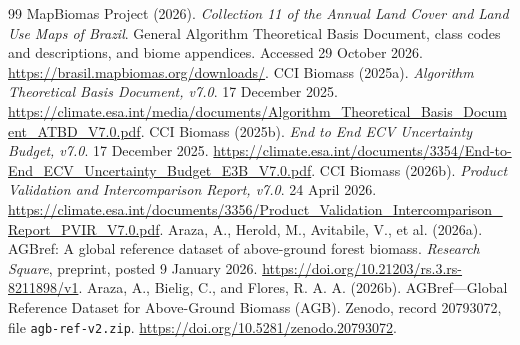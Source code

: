 \documentclass[11pt,a4paper]{article}
\begin{document}
\begin{thebibliography}{99}
 MapBiomas Project (2026). \emph{Collection 11 of the Annual Land Cover and Land Use Maps of Brazil}. General Algorithm Theoretical Basis Document, class codes and descriptions, and biome appendices. Accessed 29 October 2026. \url{https://brasil.mapbiomas.org/downloads/}.
 CCI Biomass (2025a). \emph{Algorithm Theoretical Basis Document, v7.0}. 17 December 2025. \url{https://climate.esa.int/media/documents/Algorithm_Theoretical_Basis_Document_ATBD_V7.0.pdf}.
 CCI Biomass (2025b). \emph{End to End ECV Uncertainty Budget, v7.0}. 17 December 2025. \url{https://climate.esa.int/documents/3354/End-to-End_ECV_Uncertainty_Budget_E3B_V7.0.pdf}.
 CCI Biomass (2026b). \emph{Product Validation and Intercomparison Report, v7.0}. 24 April 2026. \url{https://climate.esa.int/documents/3356/Product_Validation_Intercomparison_Report_PVIR_V7.0.pdf}.
 Araza, A., Herold, M., Avitabile, V., et al. (2026a). AGBref: A global reference dataset of above-ground forest biomass. \emph{Research Square}, preprint, posted 9 January 2026. \url{https://doi.org/10.21203/rs.3.rs-8211898/v1}.
 Araza, A., Bielig, C., and Flores, R. A. A. (2026b). AGBref---Global Reference Dataset for Above-Ground Biomass (AGB). Zenodo, record 20793072, file \texttt{agb-ref-v2.zip}. \url{https://doi.org/10.5281/zenodo.20793072}.


\end{thebibliography}
\end{document}
